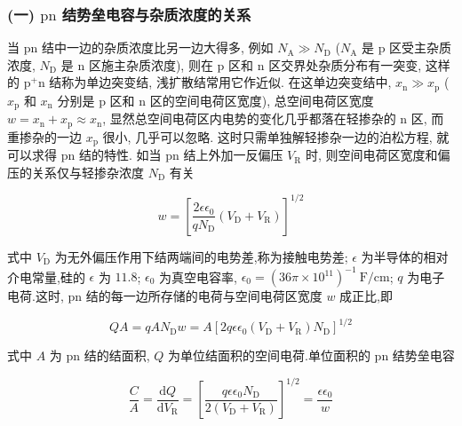 \documentclass[12pt,a4paper]{article}
\begin{document}
\subsubsection*{(一) \(\mathrm{pn}\) 结势垒电容与杂质浓度的关系}

当 \(\mathrm{pn}\) 结中一边的杂质浓度比另一边大得多, 例如 \(N_{\mathrm{A}} \gg N_{\mathrm{D}}\) (\(N_{\mathrm{A}}\) 是 \(\mathrm{p}\) 区受主杂质浓度, \(N_{\mathrm{D}}\) 是 \(\mathrm{n}\) 区施主杂质浓度), 则在 \(\mathrm{p}\) 区和 \(\mathrm{n}\) 区交界处杂质分布有一突变, 这样的 \(\mathrm{p}^+ \mathrm{n}\) 结称为单边突变结, 浅扩散结常用它作近似. 在这单边突变结中, \(x_{\mathrm{n}} \gg x_{\mathrm{p}}\) (\(x_{\mathrm{p}}\) 和 \(x_{\mathrm{n}}\) 分别是 \(\mathrm{p}\) 区和 \(\mathrm{n}\) 区的空间电荷区宽度), 总空间电荷区宽度 \(w = x_{\mathrm{n}} + x_{\mathrm{p}} \approx x_{\mathrm{n}}\), 显然总空间电荷区内电势的变化几乎都落在轻掺杂的 \(\mathrm{n}\) 区, 而重掺杂的一边 \(x_{\mathrm{p}}\) 很小, 几乎可以忽略. 这时只需单独解轻掺杂一边的泊松方程, 就可以求得 \(\mathrm{pn}\) 结的特性. 如当 \(\mathrm{pn}\) 结上外加一反偏压 \(V_{\mathrm{R}}\) 时, 则空间电荷区宽度和偏压的关系仅与轻掺杂浓度 \(N_{\mathrm{D}}\) 有关

\[
w = \left[\frac{2 \epsilon \epsilon_{0}}{q N_{\mathrm{D}}} (V_{\mathrm{D}} + V_{\mathrm{R}})\right]^{1 / 2} \tag{9-2-1}
\]

式中 \(V_{\mathrm{D}}\) 为无外偏压作用下结两端间的电势差,称为接触电势差; \(\epsilon\) 为半导体的相对介电常量,硅的 \(\epsilon\) 为 \(11.8\); \(\epsilon_{0}\) 为真空电容率, \(\epsilon_{0} = (36 \pi \times 10^{11})^{- 1} \mathrm{~F} / \mathrm{cm}\); \(q\) 为电子电荷.这时, \(\mathrm{pn}\) 结的每一边所存储的电荷与空间电荷区宽度 \(w\) 成正比,即

\[
Q A = q A N_{\mathrm{D}}w = A\left[2q\epsilon \epsilon_{0}\left(V_{\mathrm{D}} + V_{\mathrm{R}}\right)N_{\mathrm{D}}\right]^{1 / 2}
\]

式中 \(A\) 为 \(\mathrm{pn}\) 结的结面积, \(Q\) 为单位结面积的空间电荷.单位面积的 \(\mathrm{pn}\) 结势垒电容

\[
\frac{C}{A} = \frac{\mathrm{d}Q}{\mathrm{d}V_{\mathrm{R}}} = \left[\frac{q\epsilon \epsilon_{0}N_{\mathrm{D}}}{2\left(V_{\mathrm{D}} + V_{\mathrm{R}}\right)}\right]^{1 / 2} = \frac{\epsilon \epsilon_{0}}{w} \tag{9-2-2}
\]
\end{document}
